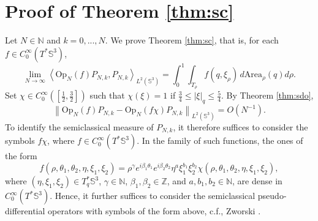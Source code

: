 \documentclass[12pt,reqno]{amsart}
\newcommand\Area{\mathrm{Area}}
\newcommand\N{\mathbb{N}}
\newcommand\Op{\mathrm{Op}}
\newcommand\Sb{\mathbb{S}}
\newcommand\Z{\mathbb{Z}}
\theoremstyle{plain}
\theoremstyle{remark}
\numberwithin{equation}{section}
\begin{document}
\section{Proof of Theorem \ref{thm:sc}}
Let $N\in\N$ and $k=0,...,N$. We prove Theorem \ref{thm:sc}, that is, for each $f\in C^\infty_0(T^*\Sb^3)$,
$$\lim_{N\to\infty}\left\langle\Op_N(f)P_{N,k},P_{N,k}\right\rangle_{L^2(\Sb^3)}=\int_0^1\int_{T_\rho}f\left(q,\xi_\rho\right)\,d\Area_\rho(q)d\rho.$$
Set $\chi\in C^\infty_0([\frac12,\frac32])$ such that $\chi(\xi)=1$ if $\frac34\le|\xi|_q\le\frac54$. By Theorem \ref{thm:sdo},
$$\left\|\Op_N(f)P_{N,k}-\Op_N(f\chi)P_{N,k}\right\|_{L^2(\Sb^3)}=O\left(N^{-1}\right).$$
To identify the semiclassical measure of $P_{N,k}$, it therefore suffices to consider the symbols $f\chi$, where $f\in C_0^\infty(T^*\Sb^3)$. In the family of such functions, the ones of the form
$$f\left(\rho,\theta_1,\theta_2,\eta,\xi_1,\xi_2\right)=\rho^\gamma e^{i\beta_1\theta_1}e^{i\beta_2\theta_2}\eta^a\xi_1^{b_1}\xi_2^{b_2}\chi\left(\rho,\theta_1,\theta_2,\eta,\xi_1,\xi_2\right),$$ 
where $(\eta,\xi_1,\xi_2)\in T^*_q\Sb^3$, $\gamma\in\N$, $\beta_1,\beta_2\in\Z$, and $a,b_1,b_2\in\N$, are dense in $C_0^\infty(T^*\Sb^3)$. Hence, it further suffices to consider the semiclassical pseudo-differential operators with symbols of the form above, c.f., Zworski \cite[Theorem 5.2]{Zw}.
\end{document}
